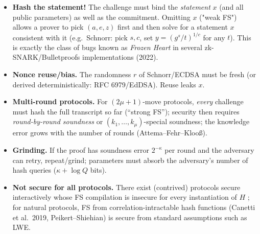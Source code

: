 \documentclass[11pt,a4paper]{report}
\theoremstyle{plain}
\theoremstyle{definition}
\theoremstyle{remark}
\begin{document}
\begin{warning}
\begin{itemize}
\item \textbf{Hash the statement!} The challenge must bind the \emph{statement} $x$ (and all public parameters) as well as the commitment. Omitting $x$ ("weak FS") allows a prover to pick $(a,e,z)$ first and then solve for a statement $x$ consistent with it (e.g.\ Schnorr: pick $s,c$, set $y=(g^s/t)^{1/c}$ for any $t$). This is exactly the class of bugs known as \emph{Frozen Heart} in several zk-SNARK/Bulletproofs implementations (2022).
\item \textbf{Nonce reuse/bias.} The randomness $r$ of Schnorr/ECDSA must be fresh (or derived deterministically: RFC 6979/EdDSA). Reuse leaks $x$.
\item \textbf{Multi-round protocols.} For $(2\mu+1)$-move protocols, \emph{every} challenge must hash the full transcript so far (``strong FS''); security then requires \emph{round-by-round soundness} or $(k_1,\dots,k_\mu)$-special soundness; the knowledge error grows with the number of rounds (Attema--Fehr--Klooß).
\item \textbf{Grinding.} If the proof has soundness error $2^{-\kappa}$ per round and the adversary can retry, repeat/grind; parameters must absorb the adversary's number of hash queries ($\kappa+\log Q$ bits).
\item \textbf{Not secure for all protocols.} There exist (contrived) protocols secure interactively whose FS compilation is insecure for every instantiation of $H$ \cite{GK03}; for natural protocols, FS from correlation-intractable hash functions (Canetti et al.\ 2019, Peikert--Shiehian) is secure from standard assumptions such as LWE.
\end{itemize}
\end{warning}
\end{document}
